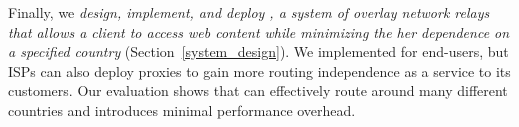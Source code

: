 Finally, we {\em design, implement, and deploy \system{}, a system of overlay network relays that allows
a client to access web content while minimizing the her dependence on a specified
country} (Section~\ref{system_design}).  We implemented \system{} for end-users, 
but ISPs can also deploy \system{} proxies to gain more routing independence as a service 
to its customers.  Our evaluation shows that \system{} can effectively route around many different countries and
introduces minimal performance overhead.
